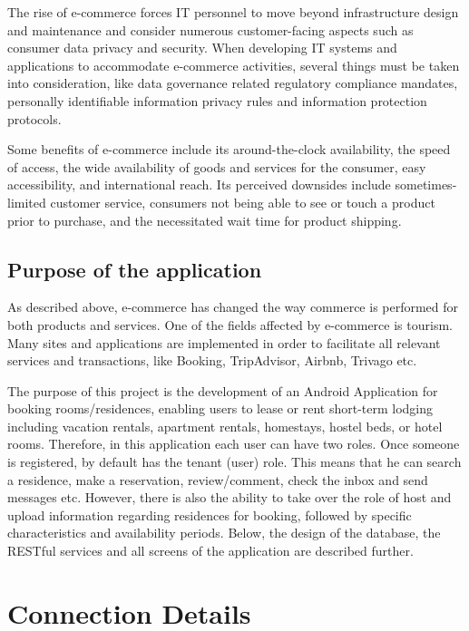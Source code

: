 \documentclass[12pt]{article}
\begin{document}
	
	The rise of e-commerce forces IT personnel to move beyond infrastructure design and maintenance and consider numerous customer-facing aspects such as consumer data privacy and security. When developing IT systems and applications to accommodate e-commerce activities, several things must be taken into consideration, like data governance related regulatory compliance mandates, personally identifiable information privacy rules and information protection protocols.
	
	Some benefits of e-commerce include its around-the-clock availability, the speed of access, the wide availability of goods and services for the consumer, easy accessibility, and international reach. Its perceived downsides include sometimes-limited customer service, consumers not being able to see or touch a product prior to purchase, and the necessitated wait time for product shipping.
	
	\subsection{Purpose of the application}
	
	As described above, e-commerce has changed the way commerce is performed for both products and services. One of the fields affected by e-commerce is tourism. Many sites and applications are implemented in order to facilitate all relevant services and transactions, like Booking, TripAdvisor, Airbnb, Trivago etc.
	
	The purpose of this project is the development of an Android Application for booking rooms/residences, enabling users to lease or rent short-term lodging including vacation rentals, apartment rentals, homestays, hostel beds, or hotel rooms. Therefore, in this application each user can have two roles. Once someone is registered, by default has the tenant (user) role. This means that he can search a residence, make a reservation, review/comment, check the inbox and send messages etc. However, there is also the ability to take over the role of host and upload information regarding residences for booking, followed by specific characteristics and availability periods. Below, the design of the database, the RESTful services and all screens of the application are described further.
	
	\section{Connection Details}
	
\end{document}
